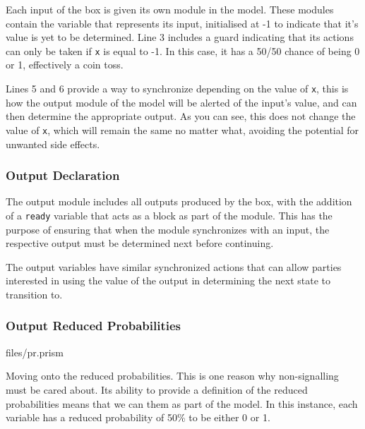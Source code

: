 \documentclass[report.tex]{subfiles}
\begin{document}
Each input of the box is given its own module in the model. These modules
contain the variable that represents its input, initialised at -1 to indicate
that it's value is yet to be determined. Line 3 includes a guard indicating that
its actions can only be taken if \texttt{x} is equal to -1. In this case, it has
a 50/50 chance of being 0 or 1, effectively a coin toss.

Lines 5 and 6 provide a way to synchronize depending on the value of \texttt{x},
this is how the output module of the model will be alerted of the input's value,
and can then determine the appropriate output. As you can see, this does not
change the value of \texttt{x}, which will remain the same no matter what,
avoiding the potential for unwanted side effects.

\subsubsection{Output Declaration} %
\label{ssub:output_declaration}
 

The output module includes all outputs produced by the box, with the addition of
a \texttt{ready} variable that acts as a block as part of the module. This has
the purpose of ensuring that when the module synchronizes with an input, the
respective output must be determined next before continuing. 

The output variables have similar synchronized actions that can allow parties 
interested in using the value of the output in determining the next state to
transition to.

\subsubsection{Output Reduced Probabilities} %
\label{ssub:output_reduced_probabilities}

{files/pr.prism} 

Moving onto the reduced probabilities. This is one reason why non-signalling
must be cared about. Its ability to provide a definition of the reduced
probabilities means that we can them as part of the model. In this instance,
each variable has a reduced probability of 50\% to be either 0 or 1. 
\end{document}
